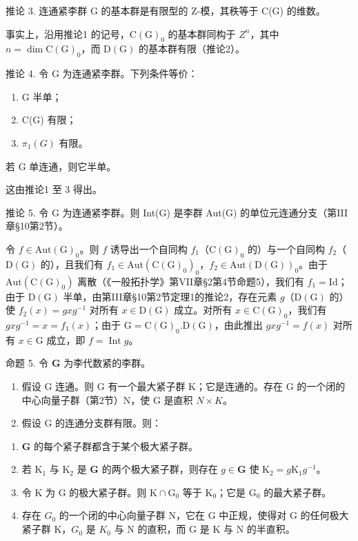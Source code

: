 推论 3. 连通紧李群 G 的基本群是有限型的 Z-模，其秩等于 C(G) 的维数。

事实上，沿用推论1 的记号，\(\mathrm{C}(\mathrm{G})_{0}\) 的基本群同构于 \(Z^{n}\)，其中 \(n = \dim \mathrm{C}(\mathrm{G})_{0}\)，而 \(\mathrm{D}(\mathrm{G})\) 的基本群有限（推论2）。

推论 4. 令 G 为连通紧李群。下列条件等价：

\begin{enumerate}
\def\labelenumi{(\roman{enumi})}
\item
  G 半单；
\item
  C(G) 有限；
\item
  \(\pi_{1}(G)\) 有限。
\end{enumerate}

若 \(\mathrm{G}\) 单连通，则它半单。

这由推论1 至 3 得出。

推论 5. 令 G 为连通紧李群。则 Int(G) 是李群 Aut(G) 的单位元连通分支（第III章§10第2节）。

令 \(f \in \mathrm{Aut}(\mathrm{G})_0\)。则 \(f\) 诱导出一个自同构 \(f_1\)（\(\mathrm{C}(\mathrm{G})_0\) 的）与一个自同构 \(f_2\)（\(\mathrm{D}(\mathrm{G})\) 的），且我们有 \(f_1 \in \mathrm{Aut}(\mathrm{C}(\mathrm{G})_0)_0\)，\(f_2 \in \mathrm{Aut}(\mathrm{D}(\mathrm{G}))_0\)。由于 \(\mathrm{Aut}(\mathrm{C}(\mathrm{G})_0)\) 离散（《一般拓扑学》第VII章§2第4节命题5），我们有 \(f_1 = \mathrm{Id}\)；由于 \(\mathrm{D}(\mathrm{G})\) 半单，由第III章§10第2节定理1的推论2，存在元素 \(g\)（\(\mathrm{D}(\mathrm{G})\) 的）使 \(f_2(x) = g x g^{-1}\) 对所有 \(x \in \mathrm{D}(\mathrm{G})\) 成立。对所有 \(x \in \mathrm{C}(\mathrm{G})_0\)，我们有 \(g x g^{-1} = x = f_1(x)\)；由于 \(\mathrm{G} = \mathrm{C}(\mathrm{G})_0.\mathrm{D}(\mathrm{G})\)，由此推出 \(g x g^{-1} = f(x)\) 对所有 \(x \in \mathrm{G}\) 成立，即 \(f = \operatorname{Int} g\)。

命题 5. 令 \(\mathbf{G}\) 为李代数紧的李群。

\begin{enumerate}
\def\labelenumi{\alph{enumi})}
\item
  假设 G 连通。则 G 有一个最大紧子群 K；它是连通的。存在 G 的一个闭的中心向量子群（第2节）N，使 G 是直积 \(N \times K\)。
\item
  假设 G 的连通分支群有限。则：
\end{enumerate}

\begin{enumerate}
\def\labelenumi{(\roman{enumi})}
\item
  \(\mathbf{G}\) 的每个紧子群都含于某个极大紧子群。
\item
  若 \(\mathrm{K}_1\) 与 \(\mathrm{K}_2\) 是 \(\mathbf{G}\) 的两个极大紧子群，则存在 \(g \in \mathbf{G}\) 使 \(\mathrm{K}_2 = g\mathrm{K}_1g^{-1}\)。
\item
  令 \(\mathrm{K}\) 为 \(\mathrm{G}\) 的极大紧子群。则 \(\mathrm{K} \cap \mathrm{G}_0\) 等于 \(\mathrm{K}_0\)；它是 \(\mathrm{G}_0\) 的最大紧子群。
\item
  存在 \(G_{0}\) 的一个闭的中心向量子群 N，它在 G 中正规，使得对 G 的任何极大紧子群 K，\(G_{0}\) 是 \(K_{0}\) 与 N 的直积，而 G 是 K 与 N 的半直积。
\end{enumerate}

